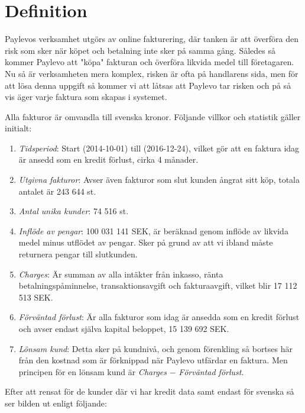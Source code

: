 \documentclass[swedish, english, 11pt ]{article}
\numberwithin{equation}{section}
\begin{document}
\section{Definition} 
\label{sec:1} 
Paylevos verksamhet utgörs av online fakturering, där tanken är att överföra den risk som sker när köpet och 
betalning inte sker på samma gång. Således så kommer Paylevo att "köpa" fakturan och överföra likvida 
medel till företagaren.  Nu så är verksamheten mera komplex, risken är ofta på handlarens sida, men för att 
lösa denna uppgift så kommer vi att låtsas att Paylevo tar risken och på så vis äger varje faktura som skapas 
i systemet.  

Alla fakturor är omvandla till svenska kronor. Följande villkor och statistik gäller initialt:

\begin{enumerate}[label=\emph{\arabic*})]
	\item \textit{Tidsperiod}:  Start (2014-10-01) till  (2016-12-24), vilket gör 
		att en faktura idag är ansedd som en kredit förlust, cirka 4 månader.
	\item \textit{Utgivna fakturor}: Avser även fakturor som slut kunden  ångrat sitt köp, totala antalet är 243 644 st.
	\item \textit{Antal unika kunder}:  74 516 st. %
	\item \textit{Inflöde av pengar}:  100 031 141 SEK, är beräknad genom inflöde av likvida medel minus utflödet av pengar. %
		Sker på grund av att vi ibland måste returnera pengar till slutkunden. 
	\item \textit{Charges}: Är summan av alla intäkter från inkasso, ränta betalningspåminnelse, transaktionsavgift och fakturaavgift, vilket blir 17 112 513  SEK. %
	\item \textit{Förväntad förlust}: Är alla fakturor som idag är ansedda som en kredit förlust och avser endast själva kapital beloppet,  15 139 692  SEK. %
	\item \textit{Lönsam kund}: Detta sker på kundnivå, och genom förenkling så bortses här från den kostnad som är förknippad när Paylevo utfärdar en faktura. Men principen för en 
		lönsam kund är \textit{Charges} $-$ \textit{Förväntad förlust}.
\end{enumerate}

Efter att rensat för de kunder där vi har kredit data samt endast för svenska så ser bilden ut enligt följande:
\end{document}
